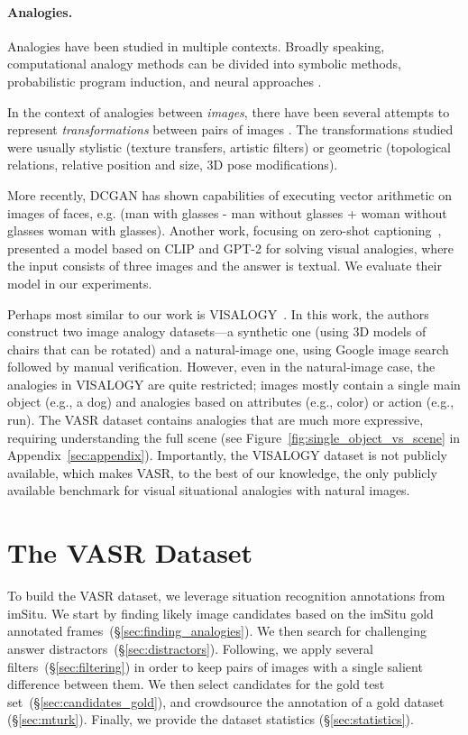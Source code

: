 \documentclass[letterpaper]{article} \usepackage{aaai23}  \usepackage{times}  \usepackage{helvet}  \usepackage{courier}  \usepackage[hyphens]{url}  \usepackage{graphicx} \urlstyle{rm} \def\UrlFont{\rm}  \usepackage{natbib}  \usepackage{caption} \frenchspacing  \setlength{\pdfpagewidth}{8.5in}  \setlength{\pdfpageheight}{11in}  \usepackage{algorithm}
\begin{document}
\paragraph{Analogies.} 
Analogies have been studied in multiple contexts. Broadly speaking, computational analogy methods can be divided into symbolic methods, probabilistic program induction, and neural approaches \cite{mitchell2021abstraction}. 


In the context of analogies between \emph{images}, there have been several attempts to represent \emph{transformations} between pairs of images \cite{memisevic2010learning,reed2015deep,hertzmann2001image,forbus2011cogsketch}. The transformations studied were usually stylistic (texture transfers, artistic filters) or geometric (topological relations, relative position and size, 3D pose modifications). 

More recently, DCGAN \cite{radford2015unsupervised} has shown capabilities of executing vector arithmetic on images of faces, e.g. (man with glasses - man without glasses + woman without glasses  woman with glasses). Another work, focusing on zero-shot captioning~\cite{tewel2021zero}, presented a model based on CLIP and GPT-2 \cite{radford2019language} for solving visual analogies, where the input consists of three images and the answer is textual. We evaluate their model in our experiments. 

Perhaps most similar to our work is VISALOGY~\cite{sadeghi2015visalogy}. In this work, the authors construct two image analogy datasets---a synthetic one (using 3D models of chairs that can be rotated) and a natural-image one, using Google image search followed by manual verification. However, even in the natural-image case, the analogies in VISALOGY are quite restricted; images mostly contain a single main object (e.g., a dog) and analogies based on attributes (e.g., color) or action (e.g., run). The VASR dataset contains analogies that are much more expressive, requiring understanding the full scene (see Figure~\ref{fig:single_object_vs_scene} in Appendix~\ref{sec:appendix}).
Importantly, the VISALOGY dataset is not publicly available, which makes VASR, to the best of our knowledge, the only publicly available benchmark for visual situational analogies with natural images.

\section{The VASR Dataset}
To build the VASR dataset, we leverage situation recognition annotations from imSitu. We start by finding likely image candidates based on the imSitu gold annotated frames~(\S\ref{sec:finding_analogies}). We then search for challenging answer distractors~(\S\ref{sec:distractors}). Following, we apply several filters~(\S\ref{sec:filtering}) in order to keep pairs of images with a single salient difference between them. We then select candidates for the gold test set~(\S\ref{sec:candidates_gold}), and crowdsource the annotation of a gold dataset (\S\ref{sec:mturk}). Finally, we provide the dataset statistics (\S\ref{sec:statistics}).
\end{document}
